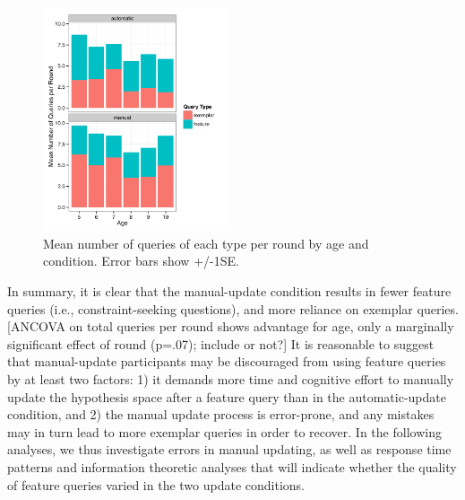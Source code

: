 \documentclass[10pt,letterpaper]{article}
\begin{document}
\begin{figure}[!h]
  \centering
  \includegraphics[width=0.49\textwidth]{figures/clicks_by_age_condition_query_type}
  \caption{Mean number of queries of each type per round by age and condition. Error bars show +/-1SE.}
  \label{fig:clicks-per-agecond}
\end{figure} 

In summary, it is clear that the manual-update condition results in fewer feature queries (i.e., constraint-seeking questions), and more reliance on exemplar queries. [ANCOVA on total queries per round shows advantage for age, only a marginally significant effect of round (p=.07); include or not?] It is reasonable to suggest that manual-update participants may be discouraged from using feature queries by at least two factors: 1) it demands more time and cognitive effort to manually update the hypothesis space after a feature query than in the automatic-update condition, and 2) the manual update process is error-prone, and any mistakes may in turn lead to more exemplar queries in order to recover. In the following analyses, we thus investigate errors in manual updating, as well as response time patterns and information theoretic analyses that will indicate whether the quality of feature queries varied in the two update conditions.



\end{document}
